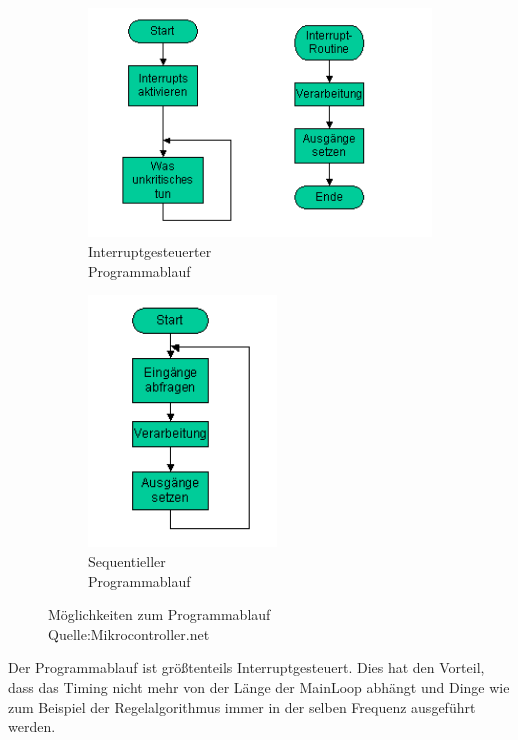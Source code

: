 \documentclass[a4paper, 11pt]{scrartcl}
\begin{document}
			\begin{figure}[h]
				\centering
				\begin{subfigure}{0.47\textwidth}
					\centering
					\includegraphics[width=1.1\textwidth]{bilder/Interrupt_Programme.png}
					\caption{Interruptgesteuerter \\Programmablauf}
					\label{InterruptgesteuerterProgrammablauf}
				\end{subfigure}
				\begin{subfigure}{0.47\textwidth}
					\centering
					\includegraphics[width=0.55\textwidth]{bilder/Sequentielle_Programme.png}
					\caption{Sequentieller \\Programmablauf}
					\label{SequentiellerProgrammablauf}
				\end{subfigure}
				\caption[Möglichkeiten zum Programmablauf]{Möglichkeiten zum Programmablauf\\Quelle:Mikrocontroller.net}\label{Programmablauf}
			\end{figure}
			Der Programmablauf ist größtenteils Interruptgesteuert.
			Dies hat den Vorteil, dass das Timing nicht mehr von der Länge der MainLoop abhängt und Dinge wie zum  Beispiel der Regelalgorithmus immer in der selben Frequenz ausgeführt werden.
\end{document}
